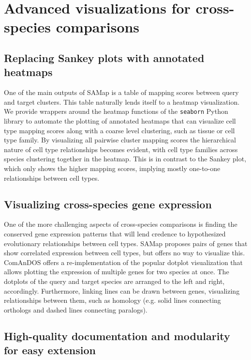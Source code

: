 \documentclass{article}
\begin{document}
\section{Advanced visualizations for cross-species comparisons}

\subsection{Replacing Sankey plots with annotated heatmaps}

One of the main outputs of SAMap is a table of mapping scores between query and target clusters.
This table naturally lends itself to a heatmap visualization. We provide wrappers around the heatmap
functions of the \texttt{seaborn} Python library \cite{bisong2019matplotlib} to automate the
plotting of annotated heatmaps that can visualize cell type mapping scores along with a coarse level
clustering, such as tissue or cell type family. By visualizing all pairwise cluster mapping scores
the hierarchical nature of cell type relationships becomes evident, with cell type families across
species clustering together in the heatmap. This is in contrast to the Sankey plot, which only shows
the higher mapping scores, implying mostly one-to-one relationships between cell types.

\subsection{Visualizing cross-species gene expression}

One of the more challenging aspects of cross-species comparisons is finding the conserved gene
expression patterns that will lend credence to hypothesized evolutionary relationships between cell
types. SAMap proposes pairs of genes that show correlated expression between cell types, but offers
no way to visualize this. ComAnDOS offers a re-implementation of the popular dotplot visualization
that allows plotting the expression of multiple genes for two species at once. The dotplots of the
query and target species are arranged to the left and right, accordingly. Furthermore, linking lines
can be drawn between genes, visualizing relationships between them, such as homology (e.g. solid
lines connecting orthologs and dashed lines connecting paralogs).

\subsection{High-quality documentation and modularity for easy extension}
\end{document}
